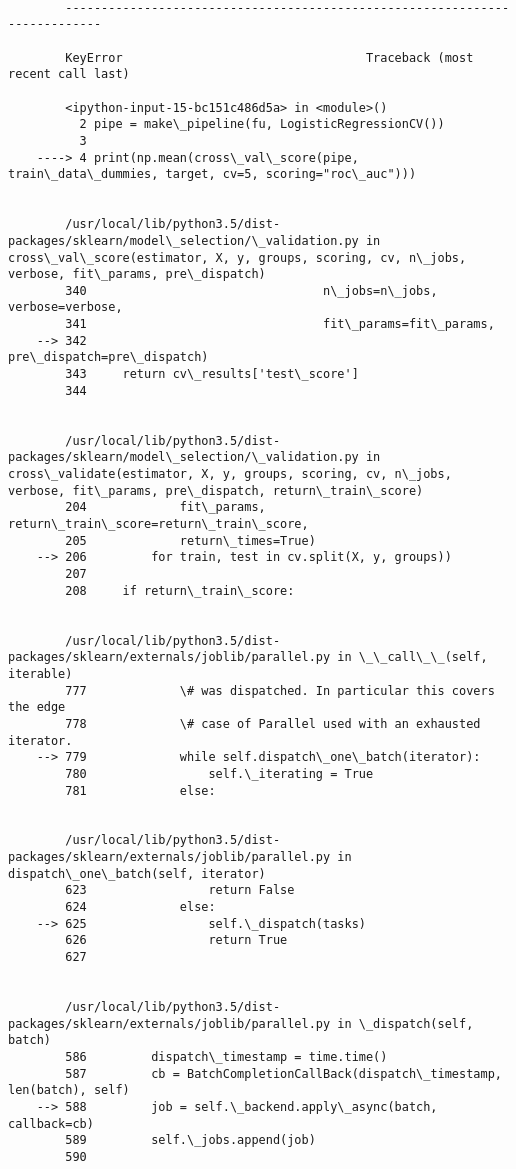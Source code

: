 \documentclass[11pt]{article}
\begin{document}
    \begin{Verbatim}[commandchars=\\\{\}]

        ---------------------------------------------------------------------------

        KeyError                                  Traceback (most recent call last)

        <ipython-input-15-bc151c486d5a> in <module>()
          2 pipe = make\_pipeline(fu, LogisticRegressionCV())
          3 
    ----> 4 print(np.mean(cross\_val\_score(pipe, train\_data\_dummies, target, cv=5, scoring="roc\_auc")))
    

        /usr/local/lib/python3.5/dist-packages/sklearn/model\_selection/\_validation.py in cross\_val\_score(estimator, X, y, groups, scoring, cv, n\_jobs, verbose, fit\_params, pre\_dispatch)
        340                                 n\_jobs=n\_jobs, verbose=verbose,
        341                                 fit\_params=fit\_params,
    --> 342                                 pre\_dispatch=pre\_dispatch)
        343     return cv\_results['test\_score']
        344 


        /usr/local/lib/python3.5/dist-packages/sklearn/model\_selection/\_validation.py in cross\_validate(estimator, X, y, groups, scoring, cv, n\_jobs, verbose, fit\_params, pre\_dispatch, return\_train\_score)
        204             fit\_params, return\_train\_score=return\_train\_score,
        205             return\_times=True)
    --> 206         for train, test in cv.split(X, y, groups))
        207 
        208     if return\_train\_score:


        /usr/local/lib/python3.5/dist-packages/sklearn/externals/joblib/parallel.py in \_\_call\_\_(self, iterable)
        777             \# was dispatched. In particular this covers the edge
        778             \# case of Parallel used with an exhausted iterator.
    --> 779             while self.dispatch\_one\_batch(iterator):
        780                 self.\_iterating = True
        781             else:


        /usr/local/lib/python3.5/dist-packages/sklearn/externals/joblib/parallel.py in dispatch\_one\_batch(self, iterator)
        623                 return False
        624             else:
    --> 625                 self.\_dispatch(tasks)
        626                 return True
        627 


        /usr/local/lib/python3.5/dist-packages/sklearn/externals/joblib/parallel.py in \_dispatch(self, batch)
        586         dispatch\_timestamp = time.time()
        587         cb = BatchCompletionCallBack(dispatch\_timestamp, len(batch), self)
    --> 588         job = self.\_backend.apply\_async(batch, callback=cb)
        589         self.\_jobs.append(job)
        590 



\end{Verbatim}
\end{document}

